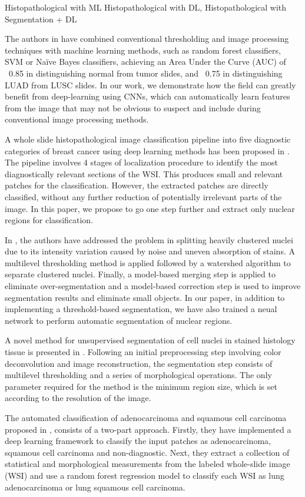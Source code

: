 \documentclass[conference]{IEEEtran}
\begin{document}
Histopathological with ML
Histopathological with DL,
Histopathological with Segmentation + DL

The authors in \cite{yu} have combined conventional thresholding and image processing techniques with machine learning methods, such as random forest classifiers, SVM or Naïve Bayes classifiers, achieving an Area Under the Curve (AUC) of ~0.85 in distinguishing normal from tumor slides, and ~0.75 in distinguishing LUAD from LUSC slides. In our work, we demonstrate how the field can greatly benefit from deep-learning using CNNs, which can automatically learn features from the image that may not be obvious to suspect and include during conventional image processing methods.

A whole slide histopathological image classification pipeline into five diagnostic categories of breast cancer using deep learning methods has been proposed in \cite{baris}. The pipeline involves 4 stages of localization procedure to identify the most diagnostically relevant sections of the WSI. This produces small and relevant patches for the classification. However, the extracted patches are directly classified, without any further reduction of potentially irrelevant parts of the image. In this paper, we propose to go one step further and extract only nuclear regions for classification.

In \cite{abdolhoseini}, the authors have addressed the problem in splitting heavily clustered nuclei due to its intensity variation caused by noise and uneven absorption of stains. A  multilevel thresholding method is applied followed by a watershed algorithm to separate clustered nuclei. Finally, a model-based merging step is applied to eliminate over-segmentation and a model-based correction step is used to improve segmentation results and eliminate small objects. In our paper, in addition to implementing a threshold-based segmentation, we have also trained a neual network to perform automatic segmentation of nuclear regions.

A novel method for unsupervised segmentation of cell nuclei in stained histology tissue is presented in \cite{phoulady}. Following an initial preprocessing step involving color deconvolution and image reconstruction, the segmentation step consists of multilevel thresholding and a series of morphological operations. The only parameter required for the method is the minimum region size, which is set according to the resolution of the image.

The automated classification of adenocarcinoma and squamous cell carcinoma proposed in \cite{simon}, consists of a two-part approach. Firstly, they have implemented a deep learning framework to classify the input patches as adenocarcinoma, squamous cell carcinoma and non-diagnostic. Next, they extract a collection of statistical and morphological measurements from the labeled whole-slide image (WSI) and use a random forest regression model to classify each WSI as lung adenocarcinoma or lung squamous cell carcinoma.
\end{document}
